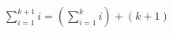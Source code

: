 \documentclass[preview]{standalone}
\begin{document}
\begin{center}
$\sum_{i=1}^{k+1} i = \left( \sum_{i=1}^{k} i \right) + (k+1)$
\end{center}
\end{document}
